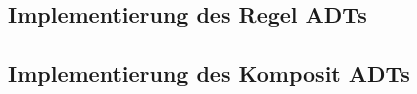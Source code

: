 \subsection{Implementierung des Regel \acs{ADT}s}
\label{app:RegelADT}

\clearpage

\subsection{Implementierung des Komposit \acs{ADT}s}
\label{app:CompositeADT}



